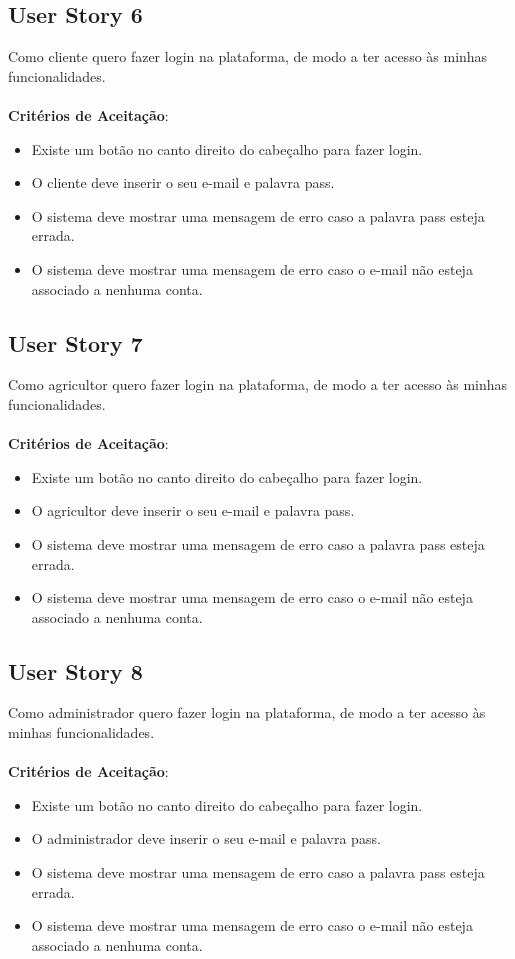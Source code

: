 \documentclass[a4paper,11pt]{article}
\begin{document}
\subsection{User Story 6}
Como cliente quero fazer login na plataforma, de modo a ter acesso às minhas funcionalidades.\\\\
\textbf{Critérios de Aceitação}:
\begin{itemize}
  \item Existe um botão no canto direito do cabeçalho para fazer login.
  \item O cliente deve inserir o seu e-mail e palavra pass.
  \item O sistema deve mostrar uma mensagem de erro caso a palavra pass esteja errada.
  \item O sistema deve mostrar uma mensagem de erro caso o e-mail não esteja associado a nenhuma conta.
\end{itemize}
\subsection{User Story 7}
Como agricultor quero fazer login na plataforma, de modo a ter acesso às minhas funcionalidades.\\\\
\textbf{Critérios de Aceitação}:
\begin{itemize}
  \item Existe um botão no canto direito do cabeçalho para fazer login.
  \item O agricultor deve inserir o seu e-mail e palavra pass.
  \item O sistema deve mostrar uma mensagem de erro caso a palavra pass esteja errada.
  \item O sistema deve mostrar uma mensagem de erro caso o e-mail não esteja associado a nenhuma conta.
\end{itemize}
\subsection{User Story 8}
Como administrador quero fazer login na plataforma, de modo a ter acesso às minhas funcionalidades.\\\\
\textbf{Critérios de Aceitação}:
\begin{itemize}
  \item Existe um botão no canto direito do cabeçalho para fazer login.
  \item O administrador deve inserir o seu e-mail e palavra pass.
  \item O sistema deve mostrar uma mensagem de erro caso a palavra pass esteja errada.
  \item O sistema deve mostrar uma mensagem de erro caso o e-mail não esteja associado a nenhuma conta.
\end{itemize}
\end{document}

